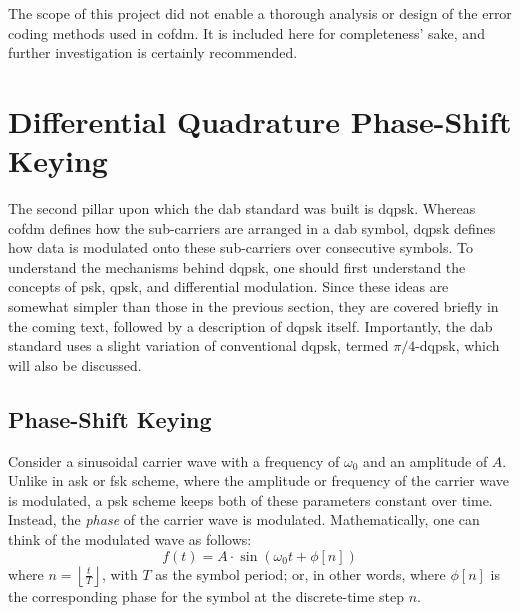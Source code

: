 \documentclass[class=report,11pt,crop=false]{standalone}
\begin{document}
The scope of this project did not enable a thorough analysis or design of the error coding methods used in \gls{cofdm}. It is included here for completeness' sake, and further investigation is certainly recommended.

\section{Differential Quadrature Phase-Shift Keying \label{sect:dab-std_psk}}
The second pillar upon which the \gls{dab} standard was built is \gls{dqpsk}. Whereas \gls{cofdm} defines how the sub-carriers are arranged in a \gls{dab} symbol, \gls{dqpsk} defines how data is modulated onto these sub-carriers over consecutive symbols. To understand the mechanisms behind \gls{dqpsk}, one should first understand the concepts of \gls{psk}, \gls{qpsk}, and differential modulation. Since these ideas are somewhat simpler than those in the previous section, they are covered briefly in the coming text, followed by a description of \gls{dqpsk} itself. Importantly, the \gls{dab} standard uses a slight variation of conventional \gls{dqpsk}, termed \(\pi/4\)-\gls{dqpsk}, which will also be discussed.

\subsection{Phase-Shift Keying}
Consider a sinusoidal carrier wave with a frequency of \(\omega_0\) and an amplitude of \(A\). Unlike in \gls{ask} or \gls{fsk} scheme, where the amplitude or frequency of the carrier wave is modulated, a \gls{psk} scheme keeps both of these parameters constant over time. Instead, the \emph{phase} of the carrier wave is modulated. Mathematically, one can think of the modulated wave as follows:
\begin{equation}
    f(t) = A \cdot \sin(\omega_0t + \phi[n])
\end{equation}
where \(n=\left\lfloor \frac{t}{T} \right\rfloor\), with \(T\) as the symbol period; or, in other words, where \(\phi[n]\) is the corresponding phase for the symbol at the discrete-time step \(n\).
\end{document}
